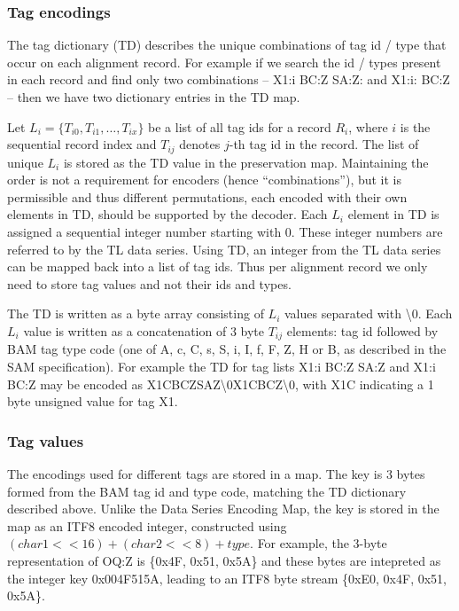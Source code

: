 \documentclass[a4paper]{article}
\begin{document}
\subsubsection*{Tag encodings}
\label{subsubsec:tags}

The tag dictionary (TD) describes the unique combinations of tag id / type that occur on each alignment record.
For example if we search the id / types present in each record and find only two combinations -- X1:i BC:Z SA:Z: and X1:i: BC:Z -- then we have two dictionary entries in the TD map.

Let $L_{i}=\{T_{i0}, T_{i1}, \ldots, T_{ix}\}$ be a list of all tag ids for a record $R_{i}$, where $i$ is the sequential record index and $T_{ij}$ denotes $j$-th tag id in the record.
The list of unique $L_{i}$ is stored as the TD value in the preservation map.
Maintaining the order is not a requirement for encoders (hence ``combinations''), but it is permissible and thus different permutations, each encoded with their own elements in TD, should be supported by the decoder.
Each $L_{i}$ element in TD is assigned a sequential integer number starting with 0.
These integer numbers are referred to by the TL data series.
Using TD, an integer from the TL data series can be mapped back into a list of tag ids.
Thus per alignment record we only need to store tag values and not their ids and types.

The TD is written as a byte array consisting of $L_{i}$ values separated with \textbackslash{}0.
Each $L_{i}$ value is written as a concatenation of 3 byte $T_{ij}$ elements: tag id followed by BAM tag type code (one of A, c, C, s, S, i, I, f, F, Z, H or B, as described in the SAM specification).
For example the TD for tag lists X1:i BC:Z SA:Z and X1:i BC:Z may be encoded as X1CBCZSAZ\textbackslash{}0X1CBCZ\textbackslash{}0, with X1C indicating a 1 byte unsigned value for tag X1.

\subsubsection*{Tag values}

The encodings used for different tags are stored in a map.
The key is 3 bytes formed from the BAM tag id and type code, matching the TD dictionary described above.
Unlike the Data Series Encoding Map, the key is stored in the map as an ITF8 encoded integer, constructed using $(char1<<16) + (char2<<8) + type$.
For example, the 3-byte representation of OQ:Z is \{0x4F, 0x51, 0x5A\} and these bytes are intepreted as the integer key 0x004F515A, leading to an ITF8 byte stream \{0xE0, 0x4F, 0x51, 0x5A\}.
\end{document}
